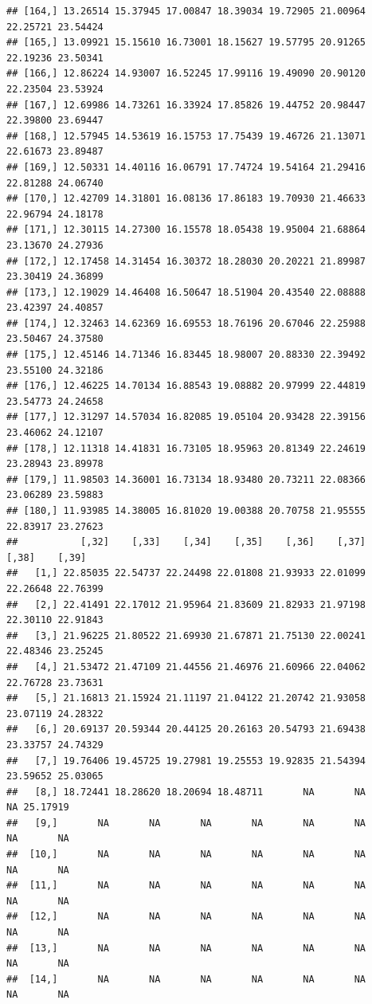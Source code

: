 \documentclass{article}\usepackage[]{graphicx}\usepackage[]{color}
\makeatletter
\newenvironment{kframe}{%
 \def\at@end@of@kframe{}%
 \ifinner\ifhmode%
  \def\at@end@of@kframe{\end{minipage}}%
  \begin{minipage}{\columnwidth}%
 \fi\fi%
 \def\FrameCommand##1{\hskip\@totalleftmargin \hskip-\fboxsep
 \colorbox{shadecolor}{##1}\hskip-\fboxsep
     \hskip-\linewidth \hskip-\@totalleftmargin \hskip\columnwidth}%
 \MakeFramed {\advance\hsize-\width
   \@totalleftmargin\z@ \linewidth\hsize
   \@setminipage}}%
 {\par\unskip\endMakeFramed%
 \at@end@of@kframe}
\newenvironment{knitrout}{}{} %
\makeatother
\begin{document}
\begin{knitrout}
\begin{kframe}
\begin{verbatim}
## [164,] 13.26514 15.37945 17.00847 18.39034 19.72905 21.00964 22.25721 23.54424
## [165,] 13.09921 15.15610 16.73001 18.15627 19.57795 20.91265 22.19236 23.50341
## [166,] 12.86224 14.93007 16.52245 17.99116 19.49090 20.90120 22.23504 23.53924
## [167,] 12.69986 14.73261 16.33924 17.85826 19.44752 20.98447 22.39800 23.69447
## [168,] 12.57945 14.53619 16.15753 17.75439 19.46726 21.13071 22.61673 23.89487
## [169,] 12.50331 14.40116 16.06791 17.74724 19.54164 21.29416 22.81288 24.06740
## [170,] 12.42709 14.31801 16.08136 17.86183 19.70930 21.46633 22.96794 24.18178
## [171,] 12.30115 14.27300 16.15578 18.05438 19.95004 21.68864 23.13670 24.27936
## [172,] 12.17458 14.31454 16.30372 18.28030 20.20221 21.89987 23.30419 24.36899
## [173,] 12.19029 14.46408 16.50647 18.51904 20.43540 22.08888 23.42397 24.40857
## [174,] 12.32463 14.62369 16.69553 18.76196 20.67046 22.25988 23.50467 24.37580
## [175,] 12.45146 14.71346 16.83445 18.98007 20.88330 22.39492 23.55100 24.32186
## [176,] 12.46225 14.70134 16.88543 19.08882 20.97999 22.44819 23.54773 24.24658
## [177,] 12.31297 14.57034 16.82085 19.05104 20.93428 22.39156 23.46062 24.12107
## [178,] 12.11318 14.41831 16.73105 18.95963 20.81349 22.24619 23.28943 23.89978
## [179,] 11.98503 14.36001 16.73134 18.93480 20.73211 22.08366 23.06289 23.59883
## [180,] 11.93985 14.38005 16.81020 19.00388 20.70758 21.95555 22.83917 23.27623
##           [,32]    [,33]    [,34]    [,35]    [,36]    [,37]    [,38]    [,39]
##   [1,] 22.85035 22.54737 22.24498 22.01808 21.93933 22.01099 22.26648 22.76399
##   [2,] 22.41491 22.17012 21.95964 21.83609 21.82933 21.97198 22.30110 22.91843
##   [3,] 21.96225 21.80522 21.69930 21.67871 21.75130 22.00241 22.48346 23.25245
##   [4,] 21.53472 21.47109 21.44556 21.46976 21.60966 22.04062 22.76728 23.73631
##   [5,] 21.16813 21.15924 21.11197 21.04122 21.20742 21.93058 23.07119 24.28322
##   [6,] 20.69137 20.59344 20.44125 20.26163 20.54793 21.69438 23.33757 24.74329
##   [7,] 19.76406 19.45725 19.27981 19.25553 19.92835 21.54394 23.59652 25.03065
##   [8,] 18.72441 18.28620 18.20694 18.48711       NA       NA       NA 25.17919
##   [9,]       NA       NA       NA       NA       NA       NA       NA       NA
##  [10,]       NA       NA       NA       NA       NA       NA       NA       NA
##  [11,]       NA       NA       NA       NA       NA       NA       NA       NA
##  [12,]       NA       NA       NA       NA       NA       NA       NA       NA
##  [13,]       NA       NA       NA       NA       NA       NA       NA       NA
##  [14,]       NA       NA       NA       NA       NA       NA       NA       NA

\end{verbatim}
\end{kframe}
\end{knitrout}
\end{document}
